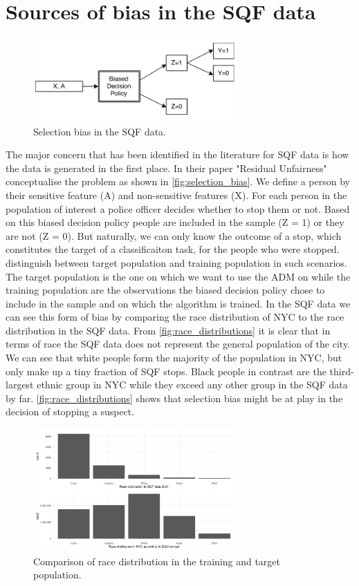 \section*{Sources of bias in the SQF data}
\begin{figure}
    \includegraphics[width=0.7\textwidth]{../figures/selection_bias.png}
    \caption{Selection bias in the SQF data.}
    \label{fig:selection_bias}
\end{figure}
The major concern that has been identified in the literature for SQF data is how the data is generated in the first place. In their paper "Residual Unfairness" \cite{kallus} conceptualise the problem as shown in \autoref{fig:selection_bias}.
We define a person by their sensitive feature (A) and non-sensitive features (X). For each person in the population of interest a police officer decides whether to stop them or not. Based on this biased decision policy people are included in the sample (Z = 1) or they are not (Z = 0). But naturally, we can only know the outcome of a stop, which constitutes the target of a classificaiton task, for the people who were stopped.
\cite{kallus} distinguish between target population and training population in such scenarios. The target population is the one on which we want to use the ADM on while the training population are the observations the biased decision policy chose to include in the sample and on which the algorithm is trained.
In the SQF data we can see this form of bias by comparing the race distribution of NYC to the race distribution in the SQF data. From \autoref{fig:race_distributions} it is clear that in terms of race the SQF data does not represent the general population of the city. We can see that white people form the majority of the population in NYC, but only make up a tiny fraction of SQF stops. Black people in contrast are the third-largest ethnic group in NYC while they exceed any other group in the SQF data by far.
\autoref{fig:race_distributions} shows that selection bias might be at play in the decision of stopping a suspect.
\begin{figure}
    \centering
    \includegraphics[width=0.7\textwidth]{../figures/sqf_case_study_plot6.png}
    \caption{Comparison of race distribution in the training and target population.}
    \label{fig:race_distributions}
\end{figure}


